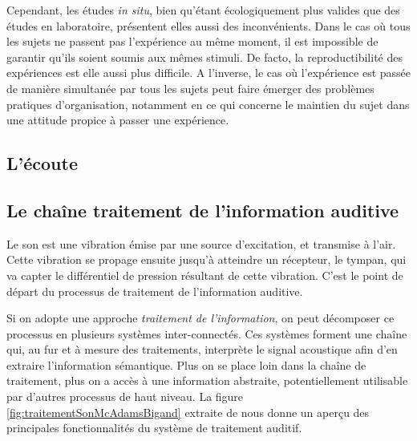 Cependant, les études \emph{in situ}, bien qu'étant écologiquement plus valides que des études en laboratoire, présentent elles aussi des inconvénients. Dans le cas où tous les sujets ne passent pas l'expérience au même moment, il est impossible de garantir qu'ils soient soumis aux mêmes stimuli. De facto, la reproductibilité des expériences est elle aussi plus difficile. A l'inverse, le cas où l'expérience est passée de manière simultanée par tous les sujets peut faire émerger des problèmes pratiques d'organisation, notamment en ce qui concerne le maintien du sujet dans une attitude propice à passer une expérience.

\subsection{L'écoute}

\subsection{Le chaîne traitement de l'information auditive}
\label{sec:chaineTaite}

Le son est une vibration émise par une source d'excitation, et transmise à l'air. Cette vibration se propage ensuite jusqu'à atteindre un récepteur, le tympan, qui va capter le différentiel de pression résultant de cette vibration. C'est le point de départ du processus de traitement de l'information auditive. 

Si on adopte une approche \emph{traitement de l'information}, on peut décomposer ce processus en plusieurs systèmes inter-connectés. Ces systèmes forment une chaîne qui, au fur et à mesure des traitements, interprète le signal acoustique afin d'en extraire l'information sémantique. Plus on se place loin dans la chaîne de traitement, plus on a accès à une information abstraite, potentiellement utilisable par d'autres processus de haut niveau. La figure \ref{fig:traitementSonMcAdamsBigand} extraite de \citep{mcadams1994penser} nous donne un aperçu des principales fonctionnalités du système de traitement auditif.

